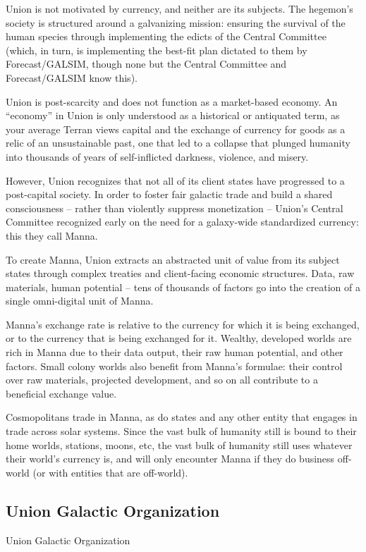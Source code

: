 Union is not motivated by currency, and neither are its subjects. The hegemon’s society is  
structured around a galvanizing mission: ensuring the survival of the human species through  
implementing the edicts of the Central Committee (which, in turn, is implementing the best-fit  
plan dictated to them by Forecast/GALSIM, though none but the Central Committee and  
Forecast/GALSIM know this). 
 

Union is post-scarcity and does not function as a market-based economy. An “economy” in  
Union is only understood as a historical or antiquated term, as your average Terran views capital  
and the exchange of currency for goods as a relic of an unsustainable past, one that led to a  
collapse that plunged humanity into thousands of years of self-inflicted darkness, violence, and  
misery. 
 

However, Union recognizes that not all of its client states have progressed to a post-capital  
society. In order to foster fair galactic trade and build a shared consciousness  -- rather than  
violently suppress monetization --  Union’s Central Committee recognized early on the need for a  
galaxy-wide standardized currency: this they call Manna. 
 

To create Manna, Union extracts an abstracted unit of value from its subject states through  
complex treaties and client-facing economic structures. Data, raw materials, human potential --  
tens of thousands of factors go into the creation of a single omni-digital unit of Manna.  
 

Manna’s exchange rate is relative to the currency for which it is being exchanged, or to the  
currency that is being exchanged for it. Wealthy, developed worlds are rich in Manna due to their  
data output, their raw human potential, and other factors. Small colony worlds also benefit from  
Manna’s formulae: their control over raw materials, projected development, and so on all  
contribute to a beneficial exchange value. 
 

Cosmopolitans trade in Manna, as do states and any other entity that engages in trade across  
solar systems. Since the vast bulk of humanity still is bound to their home worlds, stations,  
moons, etc, the vast bulk of humanity still uses whatever their world’s currency is, and will only  
encounter Manna if they do business off-world (or with entities that are off-world). 
 
\subsection{Union Galactic Organization}
Union Galactic Organization   

